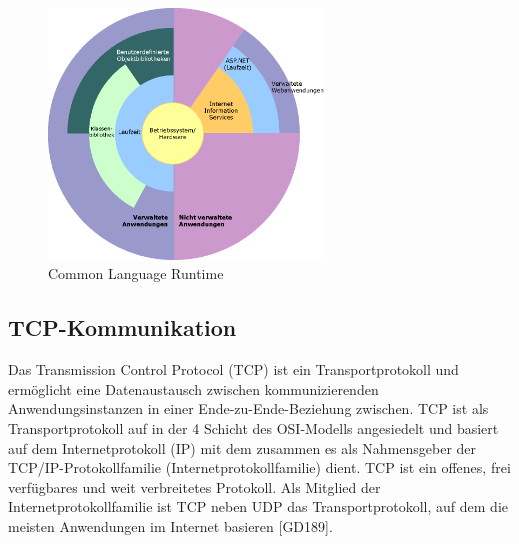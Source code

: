 \begin{figure}[h]
	\centering
	\includegraphics[width=0.65\textwidth]{images/technische_grundlagen/clr.png}
	\caption{Common Language Runtime}
	\label{fig:clr}
\end{figure}

\color{process}

\subsection{TCP-Kommunikation}
Das Transmission Control Protocol (TCP) ist ein Transportprotokoll und ermöglicht eine Datenaustausch zwischen kommunizierenden Anwendungsinstanzen in einer Ende-zu-Ende-Beziehung zwischen. TCP ist als Transportprotokoll auf in der 4 Schicht des OSI-Modells angesiedelt und basiert auf dem Internetprotokoll (IP) mit dem zusammen es als Nahmensgeber der TCP/IP-Protokollfamilie (Internetprotokollfamilie) dient.
TCP ist ein offenes, frei verfügbares und weit verbreitetes Protokoll. Als Mitglied der Internetprotokollfamilie ist TCP neben UDP das Transportprotokoll, auf dem die meisten Anwendungen im Internet basieren [GD189].
